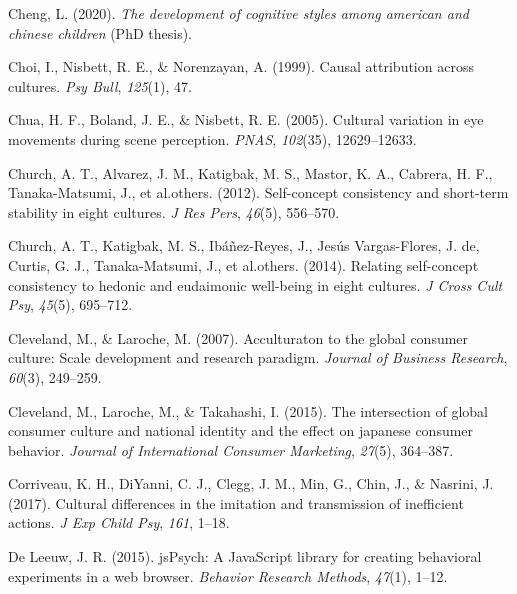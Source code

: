 \documentclass[
  man]{apa6}
\newlength{\cslhangindent}
\newlength{\cslentryspacingunit} %
\newenvironment{CSLReferences}[2] %
 {%
  \setlength{\parindent}{0pt}
  \ifodd #1
  \let\oldpar\par
  \def\par{\hangindent=\cslhangindent\oldpar}
  \fi
  \setlength{\parskip}{#2\cslentryspacingunit}
 }%
 {}
\begin{document}
\begin{CSLReferences}{1}{0}
\leavevmode{}%
Cheng, L. (2020). \emph{The development of cognitive styles among american and chinese children} (PhD thesis).

\leavevmode{}%
Choi, I., Nisbett, R. E., \& Norenzayan, A. (1999). Causal attribution across cultures. \emph{Psy Bull}, \emph{125}(1), 47.

\leavevmode{}%
Chua, H. F., Boland, J. E., \& Nisbett, R. E. (2005). Cultural variation in eye movements during scene perception. \emph{PNAS}, \emph{102}(35), 12629--12633.

\leavevmode{}%
Church, A. T., Alvarez, J. M., Katigbak, M. S., Mastor, K. A., Cabrera, H. F., Tanaka-Matsumi, J., et al.others. (2012). Self-concept consistency and short-term stability in eight cultures. \emph{J Res Pers}, \emph{46}(5), 556--570.

\leavevmode{}%
Church, A. T., Katigbak, M. S., Ibáñez-Reyes, J., Jesús Vargas-Flores, J. de, Curtis, G. J., Tanaka-Matsumi, J., et al.others. (2014). Relating self-concept consistency to hedonic and eudaimonic well-being in eight cultures. \emph{J Cross Cult Psy}, \emph{45}(5), 695--712.

\leavevmode{}%
Cleveland, M., \& Laroche, M. (2007). Acculturaton to the global consumer culture: Scale development and research paradigm. \emph{Journal of Business Research}, \emph{60}(3), 249--259.

\leavevmode{}%
Cleveland, M., Laroche, M., \& Takahashi, I. (2015). The intersection of global consumer culture and national identity and the effect on japanese consumer behavior. \emph{Journal of International Consumer Marketing}, \emph{27}(5), 364--387.

\leavevmode{}%
Corriveau, K. H., DiYanni, C. J., Clegg, J. M., Min, G., Chin, J., \& Nasrini, J. (2017). Cultural differences in the imitation and transmission of inefficient actions. \emph{J Exp Child Psy}, \emph{161}, 1--18.

\leavevmode{}%
De Leeuw, J. R. (2015). jsPsych: A JavaScript library for creating behavioral experiments in a web browser. \emph{Behavior Research Methods}, \emph{47}(1), 1--12.


\end{CSLReferences}
\end{document}
